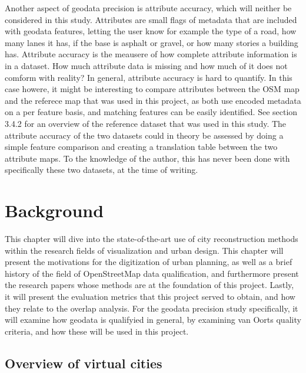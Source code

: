 \documentclass{kththesis}
\begin{document}
Another aspect of geodata precision is attribute accuracy, which will neither be considered in this study.
Attributes are small flags of metadata that are included with geodata features, letting the user know for example the type of a road, how many lanes it has, if the base is asphalt or gravel, or how many stories a building has.
Attribute accuracy is the meausere of how complete attribute information is in a dataset.
How much attribute data is missing and how much of it does not comform with reality?
In general, attribute accuracy is hard to quantify.
In this case howere, it might be interesting to compare attributes between the OSM map and the referece map that was used in this project, as both use encoded metadata on a per feature basis, and matching features can be easily identified.
See section 3.4.2 for an overview of the reference dataset that was used in this study.
The attribute accuracy of the two datasets could in theory be assessed by doing a simple feature comparison and creating a translation table between the two attribute maps.
To the knowledge of the author, this has never been done with specifically these two datasets, at the time of writing.

\chapter{Background}

This chapter will dive into the state-of-the-art use of city reconstruction methods within the research fields of visualization and urban design.
This chapter will present the motivations for the digitization of urban planning, as well as a brief history of the field of OpenStreetMap data qualification, and furthermore present the research papers whose methods are at the foundation of this project.
Lastly, it will present the evaluation metrics that this project served to obtain, and how they relate to the overlap analysis.
For the geodata precision study specifically, it will examine how geodata is qualifyied in general, by examining van Oorts quality criteria, and how these will be used in this project.

\section{Overview of virtual cities}
\end{document}
